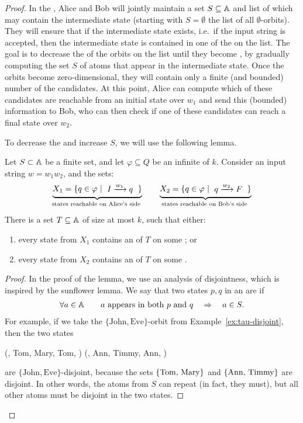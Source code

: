 \begin{proof}
In the , Alice and Bob will jointly maintain a set
$S \subseteq \mathbb A$ and list of  which may contain the
intermediate state (starting with $S = \emptyset$ the list of all
$\emptyset$-orbits). They will ensure that if the intermediate state exists,
i.e.~if the input string is accepted,  then the intermediate state is contained
in one of the  on the list. The goal is to decrease the  of the orbits on the list until they become
, by gradually computing the set $S$ of atoms that appear in
the intermediate state. Once the orbits become zero-dimensional, they will
contain only a finite (and bounded) number of the candidates. At this point,
Alice can compute which of these candidates are reachable from an initial state
over $w_1$ and send this (bounded) information to Bob, who can then check if
one of these candidates can reach a final state over $w_2$. 

To decrease the  and increase $S$, we will use the following lemma.
\begin{lemma}\label{lem:fixed-atoms}
  Let $S \subset \mathbb A$ be a finite set, and let $\varphi \subseteq Q$ be an infinite 
  of  $k$. 
  Consider an input string $w = w_1 w_2$, and the sets:
  \begin{align*}
  \myunderbrace{X_1 = \setbuild{ q \in \varphi}{$ I \xrightarrow{w_1} q$}}{states reachable on Alice's side}
  \qquad
  \myunderbrace{X_2 = \setbuild{ q \in \varphi}{$ q \xrightarrow{w_2} F$}}{states reachable on Bob's side}
  \end{align*}
  There is a set $T \subseteq \mathbb A$ of size at most $k$, such that either: 
  \begin{enumerate}
    \item   every state from $X_1$ contains an  of $T$ on some ; or 
    \item   every state from $X_2$ contains an  of $T$ on some .
  \end{enumerate}
\end{lemma}
    \begin{proof}
      \AP
 In the proof of the lemma, we use an analysis of disjointness, which is
 inspired by the sunflower lemma. We say that two states $p,q$ in an 
 are  if 
 \begin{align*}
    \forall a \in \mathbb A 
    \qquad 
 \text{$a$ appears in both $p$ and $q$} \quad \Rightarrow \quad a \in S.
 \end{align*}
 For example, if we take the $\{\textrm{John}, \textrm{Eve}\}$-orbit from Example~\ref{ex:tau-disjoint}, then the two states
\begin{center}
    (, Tom, Mary, Tom, ) \qquad
    (, Ann, Timmy, Ann, )
\end{center}
are $\{\textrm{John}, \textrm{Eve}\}$-disjoint, because the sets
$\{\text{Tom, Mary}\}$ and $\{\text{Ann, Timmy}\}$ are disjoint. In other
words, the atoms from $S$ can repeat (in fact, they must), but all other atoms
must be disjoint in the two states.


\end{proof}
\end{proof}
